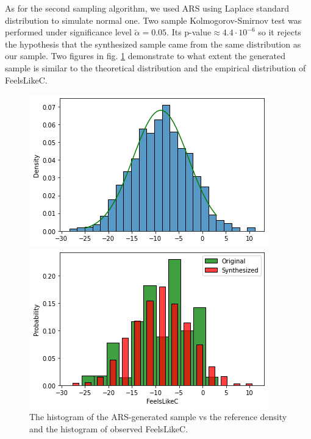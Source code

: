 \documentclass[12pt, bachelor, substylefile = algo_title.rtx]{disser}
\theoremstyle{definition}
\begin{document}
As for the second sampling algorithm, we used ARS using Laplace standard distribution to simulate normal one. Two sample Kolmogorov-Smirnov test was performed under significance level $\widetilde{\alpha} = 0.05$. Its p-value$ \approx 4.4 \cdot 10^{-6}$ so it rejects the hypothesis that the synthesized sample came from the same distribution as our sample. Two figures in fig. \ref{fig: 8} demonstrate to what extent the generated sample is similar to the theoretical distribution and the empirical distribution of FeelsLikeC.


\begin{figure}[!h]
   \begin{minipage}{.48\textwidth}
     \includegraphics[width=\linewidth]{feelslikec3}
   \end{minipage} \hfill
\begin{minipage}{.48\textwidth}
     \includegraphics[width=\linewidth]{feelslikec2}
   \end{minipage}
\caption{The histogram of the ARS-generated sample vs the reference density and the histogram of observed FeelsLikeC.} 
\label{fig: 8}
\end{figure}
\end{document}
